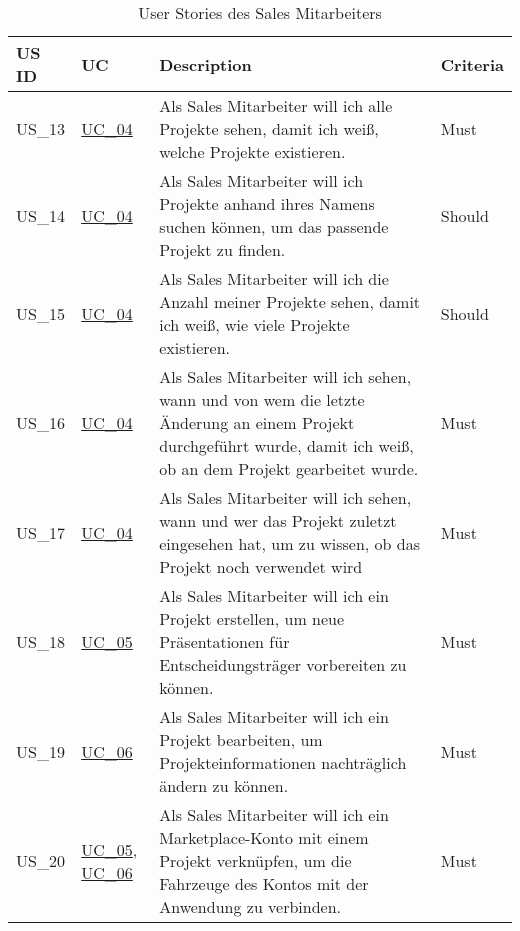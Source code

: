   \sffamily
  \begin{footnotesize}
    \begin{longtable}[L L L L]{ p{} p{} p{} p{} }
      \caption                       %
          {User Stories des Sales Mitarbeiters} %
          \\
      \toprule
      \textbf{US ID} & \textbf{UC} & \textbf{Description} & \textbf{Criteria} \\
      \midrule
      \hypertarget{Ref:US13}{US\_13} & \hyperlink{Ref:UC4}{UC\_04} & Als Sales Mitarbeiter will ich alle Projekte sehen, damit ich weiß, welche Projekte existieren. & Must \\
      \hypertarget{Ref:US14}{US\_14} & \hyperlink{Ref:UC4}{UC\_04} & Als Sales Mitarbeiter will ich Projekte anhand ihres Namens suchen können, um das passende Projekt zu finden. & Should \\
      \hypertarget{Ref:US15}{US\_15} & \hyperlink{Ref:UC4}{UC\_04} & Als Sales Mitarbeiter will ich die Anzahl meiner Projekte sehen, damit ich weiß, wie viele Projekte existieren. & Should \\
      \hypertarget{Ref:US16}{US\_16} & \hyperlink{Ref:UC4}{UC\_04} & Als Sales Mitarbeiter will ich sehen, wann und von wem die letzte Änderung an einem Projekt durchgeführt wurde, damit ich weiß, ob an dem Projekt gearbeitet wurde. & Must \\
      \hypertarget{Ref:US17}{US\_17} & \hyperlink{Ref:UC4}{UC\_04} & Als Sales Mitarbeiter will ich sehen, wann und wer das Projekt zuletzt eingesehen hat, um zu wissen, ob das Projekt noch verwendet wird & Must \\
      \hypertarget{Ref:US18}{US\_18} & \hyperlink{Ref:UC5}{UC\_05} & Als Sales Mitarbeiter will ich ein Projekt erstellen, um neue Präsentationen für Entscheidungsträger vorbereiten zu können. & Must \\
      \hypertarget{Ref:US19}{US\_19} & \hyperlink{Ref:UC6}{UC\_06} & Als Sales Mitarbeiter will ich ein Projekt bearbeiten, um Projekteinformationen nachträglich ändern zu können. & Must \\
      \hypertarget{Ref:US20}{US\_20} & \hyperlink{Ref:UC5}{UC\_05}, \newline \hyperlink{Ref:UC6}{UC\_06} & Als Sales Mitarbeiter will ich ein Marketplace-Konto mit einem Projekt verknüpfen, um die Fahrzeuge des Kontos mit der Anwendung zu verbinden. & Must \\

\end{longtable}
\end{footnotesize}
